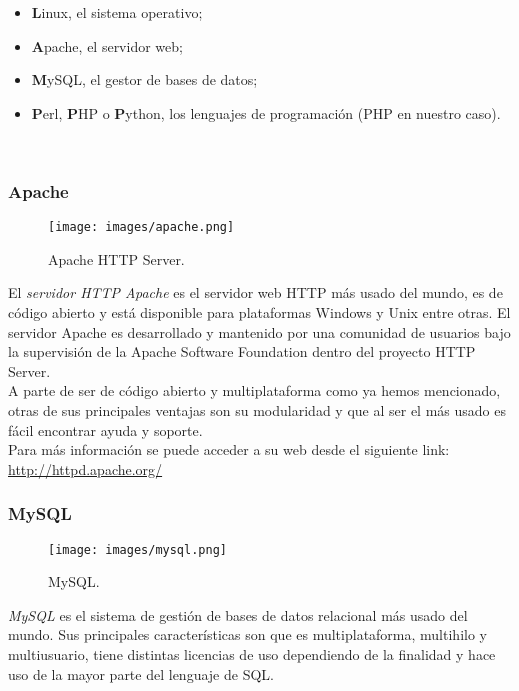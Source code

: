 \begin{itemize}
	\item \textbf{L}inux, el sistema operativo;
	\item \textbf{A}pache, el servidor web;
	\item \textbf{M}ySQL, el gestor de bases de datos;
	\item \textbf{P}erl, \textbf{P}HP o \textbf{P}ython, los lenguajes de programación (PHP en nuestro caso).
\end{itemize}
\ \\

\subsubsection*{Apache}
\begin{figure}[H]
	\centering
	\texttt{[image: images/apache.png]}
	\caption{Apache HTTP Server.}
\end{figure}
El \textit{servidor HTTP Apache} es el servidor web HTTP más usado del mundo, es de código abierto y está disponible para plataformas Windows y Unix entre otras. El servidor Apache es desarrollado y mantenido por una comunidad de usuarios bajo la supervisión de la Apache Software Foundation dentro del proyecto HTTP Server.\\

A parte de ser de código abierto y multiplataforma como ya hemos mencionado, otras de sus principales ventajas son su modularidad y que al ser el más usado es fácil encontrar ayuda y soporte.\\

Para más información se puede acceder a su web desde el siguiente link:\\ \url{http://httpd.apache.org/}

\newpage

\subsubsection*{MySQL}
\begin{figure}[H]
	\centering
	\texttt{[image: images/mysql.png]}
	\caption{MySQL.}
\end{figure}
\textit{MySQL} es el sistema de gestión de bases de datos relacional más usado del mundo. Sus principales características son que es multiplataforma, multihilo y multiusuario, tiene distintas licencias de uso dependiendo de la finalidad y hace uso de la mayor parte del lenguaje de SQL.\\


